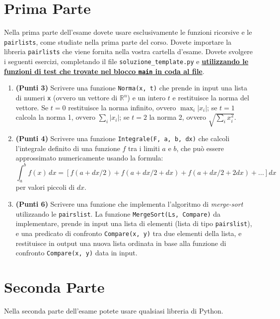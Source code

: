\section*{Prima Parte}
Nella prima parte dell'esame dovete usare esclusivamente le funzioni ricorsive e le {\tt pairlists},
come studiate nella prima parte del corso. Dovete importare la libreria {\tt pairlists} che viene fornita nella vostra
cartella d'esame. Dovete svolgere i seguenti esercizi, completando il file {\tt soluzione\_template.py}
e {\underline {\bf utilizzando le funzioni di test che trovate nel blocco {\tt main} in coda al file}}.
\begin{enumerate}
\item {\bf (Punti 3)} Scrivere una funzione {\tt Norma(x, t)} che prende in input una lista di numeri {\tt x} (ovvero un vettore di $\mathbb{R}^n$) e un intero $t$ e restituisce la norma del vettore. Se $t=0$ restituisce la norma infinito, ovvero $\max_{i}|x_i|$; se $t=1$ calcola la norma 1, ovvero $\sum_i |x_i|$;
se $t=2$ la norma 2, ovvero $\sqrt{\sum_i x_i^2}$.

\item {\bf (Punti 4)} Scrivere una funzione {\tt Integrale(F, a, b, dx)} che calcoli l'integrale definito di una funzione $f$ tra i limiti $a$ e $b$, che può essere approssimato numericamente usando la formula:
    $$
    \int_a^b f(x)\, dx = [f(a+dx/2) + f(a+dx/2+dx) + f(a+ dx/2 + 2dx )+ ...]dx
    $$
per valori piccoli di $dx$.

\item {\bf (Punti 6)} Scrivere una funzione che implementa l'algoritmo di {\it merge-sort} utilizzando le {\tt pairslist}.
La funzione {\tt MergeSort(Ls, Compare)} da implementare, prende in input una lista di elementi (lista di tipo {\tt pairslist}),
e una predicato di confronto {\tt Compare(x, y)} tra due elementi della lista,
e restituisce in output una nuova lista ordinata in base alla funzione di confronto {\tt Compare(x, y)} data in input.
\end{enumerate}


\section*{Seconda Parte}
Nella seconda parte dell'esame potete usare qualsiasi libreria di Python.

